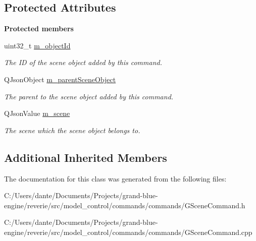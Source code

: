 \subsection*{Protected Attributes}
\begin{Indent}\textbf{ Protected members}\par
\begin{DoxyCompactItemize}
\item 
\mbox{\label{classrev_1_1_add_scene_object_command_ae3ad69706e15b2f8947b189e9eaeb6d6}} 
uint32\+\_\+t \mbox{\hyperlink{classrev_1_1_add_scene_object_command_ae3ad69706e15b2f8947b189e9eaeb6d6}{m\+\_\+object\+Id}}
\begin{DoxyCompactList}\small\item\em The ID of the scene object added by this command. \end{DoxyCompactList}\item 
\mbox{\label{classrev_1_1_add_scene_object_command_a830b90f28640044916825e2b2852cf88}} 
Q\+Json\+Object \mbox{\hyperlink{classrev_1_1_add_scene_object_command_a830b90f28640044916825e2b2852cf88}{m\+\_\+parent\+Scene\+Object}}
\begin{DoxyCompactList}\small\item\em The parent to the scene object added by this command. \end{DoxyCompactList}\item 
\mbox{\label{classrev_1_1_add_scene_object_command_a89bd752f708a623a3ed0ff43a0cd0b3c}} 
Q\+Json\+Value \mbox{\hyperlink{classrev_1_1_add_scene_object_command_a89bd752f708a623a3ed0ff43a0cd0b3c}{m\+\_\+scene}}
\begin{DoxyCompactList}\small\item\em The scene which the scene object belongs to. \end{DoxyCompactList}\end{DoxyCompactItemize}
\end{Indent}
\subsection*{Additional Inherited Members}


The documentation for this class was generated from the following files\+:\begin{DoxyCompactItemize}
\item 
C\+:/\+Users/dante/\+Documents/\+Projects/grand-\/blue-\/engine/reverie/src/model\+\_\+control/commands/commands/G\+Scene\+Command.\+h\item 
C\+:/\+Users/dante/\+Documents/\+Projects/grand-\/blue-\/engine/reverie/src/model\+\_\+control/commands/commands/G\+Scene\+Command.\+cpp\end{DoxyCompactItemize}
